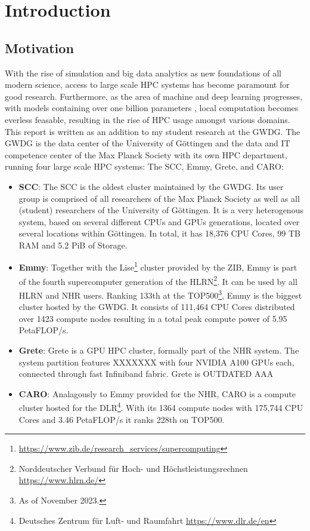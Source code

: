 \section{Introduction}
\subsection{Motivation}
With the rise of simulation and big data analytics as new foundations of all modern science,
access to large scale \ac{HPC} systems has become paramount for good research. Furthermore,
as the area of machine and deep learning progresses, with models containing over one billion
parameters \cite{gpt4param},  local computation becomes everless feasable, resulting in the 
rise of \ac{HPC} usage amongst various domains.\\

This report is written as an addition to my student research at the \ac{GWDG}. The \ac{GWDG} is the
data center of the University of Göttingen and the data and IT competence center of the 
Max Planck Society with its own \ac{HPC} department, running four large scale \ac{HPC} systems:
The \ac{SCC}, Emmy, Grete, and CARO:
\begin{itemize}
\item \textbf{\ac{SCC}}\cite{SCC}: The \ac{SCC} is the oldest cluster maintained 
by the \ac{GWDG}. Its user group is comprised of all researchers of the Max Planck Society as 
well as all (student) researchers of the University of Göttingen. It is a very heterogenous system,
based on several different CPUs and GPUs generations, located over several locations within 
Göttingen. In total, it has 18,376 CPU Cores, 99 TB RAM and 5.2 PiB of Storage.
\item \textbf{Emmy}\cite{Emmy}: Together with the Lise\footnote{
\url{https://www.zib.de/research_services/supercomputing}} cluster provided by the ZIB, Emmy is 
part of  the fourth supercomputer generation of the HLRN\footnote{Norddeutscher Verbund für Hoch- 
und Höchstleistungsrechnen \url{https://www.hlrn.de/}}. It can be used by all HLRN and NHR users.
Ranking 133th at the TOP500\footnote{As of November 2023.}, Emmy is the biggest cluster hosted by
the \ac{GWDG}. It consists of 111,464 CPU Cores distributed over 1423 compute nodes resulting 
in a total peak compute power of 5.95 PetaFLOP/s.
\item \textbf{Grete}: Grete is a GPU \ac{HPC} cluster, formally part of the NHR system.
The system partition features XXXXXXX with four NVIDIA A100 GPUs each, connected through fast
Infiniband fabric. Grete is OUTDATED AAA
\item \textbf{CARO}\cite{CARO}: Analagously to Emmy provided for the NHR, CARO is a compute cluster
hosted for the DLR\footnote{Deutsches Zentrum für Luft- und Raumfahrt \url{https://www.dlr.de/en}}.
With its 1364 compute nodes with 175,744 CPU Cores and 3.46 PetaFLOP/s it ranks 228th on TOP500.
\end{itemize}


